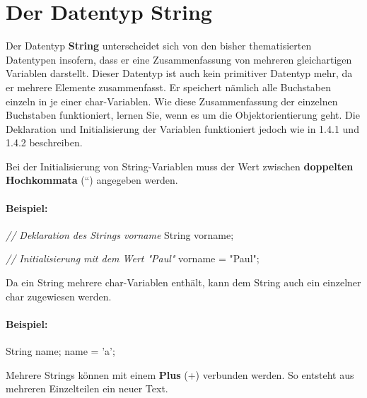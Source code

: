 \documentclass[10pt,paper=17cm:22cm, twoside=true, DIV=14]{scrbook}
\newenvironment {Shaded}
        {\begin{mdframed}[style=code] }
         {\end{mdframed}}
\newcommand{\StringTok}[1]{\textcolor[rgb]{0.4,0.4,0.4}{{#1}}}
\newcommand{\CommentTok}[1]{\textcolor[RGB]{128,128,128}{\textit{#1}}}
\newcommand{\NormalTok}[1]{#1}
\begin{document}
\section{Der Datentyp String}\label{der-datentyp-string}

Der Datentyp \textbf{String} unterscheidet sich von den bisher
thematisierten Datentypen insofern, dass er eine Zusammenfassung von
mehreren gleichartigen Variablen darstellt. Dieser Datentyp ist auch
kein primitiver Datentyp mehr, da er mehrere Elemente zusammenfasst. Er
speichert nämlich alle Buchstaben einzeln in je einer char-Variablen.
Wie diese Zusammenfassung der einzelnen Buchstaben funktioniert, lernen
Sie, wenn es um die Objektorientierung geht. Die Deklaration und
Initialisierung der Variablen funktioniert jedoch wie in 1.4.1 und 1.4.2
beschreiben.

Bei der Initialisierung von String-Variablen muss der Wert zwischen
\textbf{doppelten Hochkommata} (``) angegeben werden.

\paragraph{Beispiel:}\label{beispiel-6}

\begin{Shaded}
\begin{Highlighting}[]
\CommentTok{// Deklaration des Strings vorname}
\NormalTok{String vorname;}

\CommentTok{// Initialisierung mit dem Wert "Paul"}
\NormalTok{vorname = }\StringTok{"Paul"}\NormalTok{;}
\end{Highlighting}
\end{Shaded}

Da ein String mehrere char-Variablen enthält, kann dem String auch ein
einzelner char zugewiesen werden.

\paragraph{Beispiel:}\label{beispiel-7}

\begin{Shaded}
\begin{Highlighting}[]
\NormalTok{String name;}
\NormalTok{name = 'a';}
\end{Highlighting}
\end{Shaded}

Mehrere Strings können mit einem \textbf{Plus} (+) verbunden werden. So
entsteht aus mehreren Einzelteilen ein neuer Text.
\end{document}
